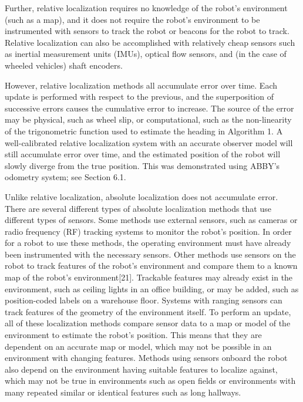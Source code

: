 \documentclass[]{cwru} %
\begin{document}
Further, relative localization requires no knowledge of the robot's
environment (such as a map), and it does not require the robot's
environment to be instrumented with sensors to track the robot or
beacons for the robot to track. Relative localization can also be
accomplished with relatively cheap sensors such as inertial measurement
units (IMUs), optical flow sensors, and (in the case of wheeled
vehicles) shaft encoders.

However, relative localization methods all accumulate error over time.
Each update is performed with respect to the previous, and the
superposition of successive errors causes the cumulative error to
increase. The source of the error may be physical, such as wheel slip,
or computational, such as the non-linearity of the trigonometric
function used to estimate the heading in Algorithm 1. A well-calibrated
relative localization system with an accurate observer model will still
accumulate error over time, and the estimated position of the robot will
slowly diverge from the true position. This was demonstrated using
ABBY's odometry system; see Section 6.1.

Unlike relative localization, absolute localization does not accumulate
error. There are several different types of absolute localization
methods that use different types of sensors. Some methods use external
sensors, such as cameras or radio frequency (RF) tracking systems to
monitor the robot's position. In order for a robot to use these methods,
the operating environment must have already been instrumented with the
necessary sensors. Other methods use sensors on the robot to track
features of the robot's environment and compare them to a known map of
the robot's environment{[}21{]}. Trackable features may already exist in
the environment, such as ceiling lights in an office building, or may be
added, such as position-coded labels on a warehouse floor. Systems with
ranging sensors can track features of the geometry of the environment
itself. To perform an update, all of these localization methods compare
sensor data to a map or model of the environment to estimate the robot's
position. This means that they are dependent on an accurate map or
model, which may not be possible in an environment with changing
features. Methods using sensors onboard the robot also depend on the
environment having suitable features to localize against, which may not
be true in environments such as open fields or environments with many
repeated similar or identical features such as long hallways.
\end{document}
